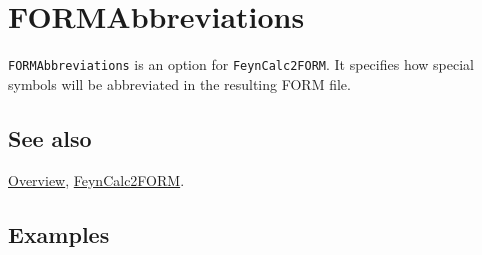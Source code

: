 \documentclass[../FeynCalcManual.tex]{subfiles}
\begin{document}
\hypertarget{formabbreviations}{
\section{FORMAbbreviations}\label{formabbreviations}}

\texttt{FORMAbbreviations} is an option for \texttt{FeynCalc2FORM}. It
specifies how special symbols will be abbreviated in the resulting FORM
file.

\subsection{See also}

\hyperlink{toc}{Overview}, \hyperlink{feyncalc2form}{FeynCalc2FORM}.

\subsection{Examples}
\end{document}
